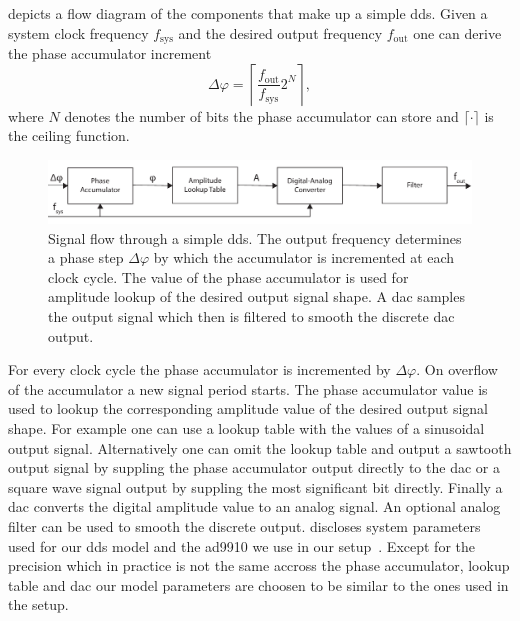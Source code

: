  depicts a flow diagram of the components
that make up a simple \gls{dds}. Given a system clock frequency $f_\text{sys}$
and the desired output frequency $f_\text{out}$ one can derive the phase
accumulator increment
\begin{equation}
  \Delta\varphi
  =
  \left\lceil\frac{f_\text{out}}{f_\text{sys}}2^N\right\rceil
  \label{eq:dds_phase_increment},
\end{equation}
where $N$ denotes the number of bits the phase accumulator can store and
$\lceil\cdot\rceil$ is the ceiling function.
\begin{figure}[htb]
  \centering
  \includegraphics[width=\textwidth]
  {../figure/digital-signal-synthesis/simple-architecture.pdf}
  \caption{Signal flow through a simple \gls{dds}. The output frequency
    determines a phase step $\Delta\varphi$ by which the accumulator is incremented at each
    clock cycle. The value of the phase accumulator is used for amplitude
    lookup of the desired output signal shape. A \gls{dac} samples the output
    signal which then is filtered to smooth the discrete \gls{dac} output.
  }\label{fig:dds_simple_architecture}
\end{figure}
For every clock cycle the phase accumulator is incremented by $\Delta\varphi$.
On overflow of the accumulator a new signal period starts. The phase
accumulator value is used to lookup the corresponding amplitude value of the
desired output signal shape. For example one can use a lookup table with the
values of a sinusoidal output signal. Alternatively one can omit the lookup
table and output a sawtooth output signal by suppling the phase accumulator
output directly to the \gls{dac} or a square wave signal output by suppling
the most significant bit directly. Finally a \gls{dac} converts the digital
amplitude value to an analog signal. An optional analog filter can be used to
smooth the discrete output.  discloses system
parameters used for our \gls{dds} model and the \gls{ad9910} we use in our
setup~\cite{AD9910}. Except for the precision which in practice is not the
same accross the phase accumulator, lookup table and \gls{dac} our model
parameters are choosen to be similar to the ones used in the setup.
